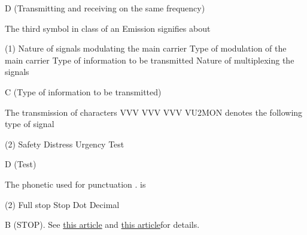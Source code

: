 \documentclass[a4paper]{article}
\begin{document}
\begin{solution}
	D (Transmitting and receiving on the same frequency)
\end{solution}

\vspace{5mm}



\begin{question}The third symbol in class of an Emission signifies about
	\begin{tasks}(1)
		\task Nature of signals modulating the main carrier
		\task Type of modulation of the main carrier
		\task Type of information to be transmitted
		\task Nature of multiplexing the signals
	\end{tasks}
\end{question}

\begin{solution}
	C (Type of information to be transmitted)
\end{solution}

\vspace{5mm}



\begin{question}The transmission of characters \apostrophe{}VVV VVV VVV VU2MON\apostrophe{} denotes the following type of signal
	\begin{tasks}(2)
		\task Safety
		\task Distress
		\task Urgency
		\task Test
	\end{tasks}
\end{question}

\begin{solution}
	D (Test)
\end{solution}

\vspace{5mm}



\begin{question}The phonetic used for punctuation \apostrophe{}.\apostrophe{} is
	\begin{tasks}(2)
		\task Full stop
		\task Stop
		\task Dot
		\task Decimal
	\end{tasks}
\end{question}

\begin{solution}
	B (STOP). See \href{https://en.wikipedia.org/wiki/Morse_code_mnemonics}{this article} and \href{https://en.wikipedia.org/wiki/NATO_phonetic_alphabet}{this article}for details.
\end{solution}
\end{document}
